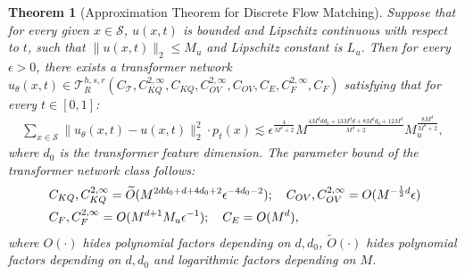 \documentclass[12pt]{article}
\numberwithin{equation}{section}
\let\tilde\widetilde
\newcommand{\wt}{\widetilde}
\renewcommand{\tilde}{\wt}
\theoremstyle{theoremstyle}
\newtheorem{theorem}{Theorem}[section]
\numberwithin{equation}{section}
\numberwithin{theorem}{section}
\numberwithin{proposition}{section}
\numberwithin{definition}{section}
\numberwithin{lemma}{section}
\numberwithin{assumption}{section}
\numberwithin{remark}{section}
\begin{document}
\begin{theorem}[Approximation Theorem for Discrete Flow Matching]\label{thm:approximation_theorem_discrete_re}
Suppose that for every given $x\in \mathcal{S}$, $u(x,t)$ is bounded and Lipschitz continuous with respect to $t$, such that $\|u(x,t)\|_2\leq M_u$ and Lipschitz constant is $L_u$.
Then for every $\epsilon>0$, there exists a transformer network $u_\theta(x,t)\in\mathcal{T}^{h,s,r}_R(C_\mathcal{T},C^{2,\infty}_{KQ},C_{KQ},C^{2,\infty}_{OV},C_{OV},C_{E},C^{2,\infty}_{F},C_{F})$ satisfying that for every $t\in[0,1]$:
\begin{align*}
    \sum_{x\in \mathcal{S}}\|u_\theta(x,t)-u(x,t)\|^2_2\cdot p_t(x) \lesssim  \epsilon^\frac{4}{M^d+2}M^{\frac{4M^ddd_0+13M^dd+8M^dd_0+12M^d}{M^d+2}}M_u^{\frac{8M^d}{M^d+2}},
\end{align*}
where $d_0$ is the transformer feature dimension.
The parameter bound of the transformer network class follows:
\begin{align*}
    & ~C_{KQ},C^{2,\infty}_{KQ}=\tilde{O}(M^{2dd_0+d+4d_0+2}\epsilon^{-4d_0-2});\quad C_{OV},C^{2,\infty}_{OV}=O(M^{-\frac{1}{2}d}\epsilon) \notag\\
    & ~C_{F},C^{2,\infty}_{F}=O(M^{d+1}M_u\epsilon^{-1});\quad C_E=O(M^d),
\end{align*}
where $O(\cdot)$ hides polynomial factors depending on $d,d_0$, $\tilde{O}(\cdot)$ hides polynomial factors depending on $d,d_0$ and logarithmic factors depending on $M$.
\end{theorem}
\end{document}
